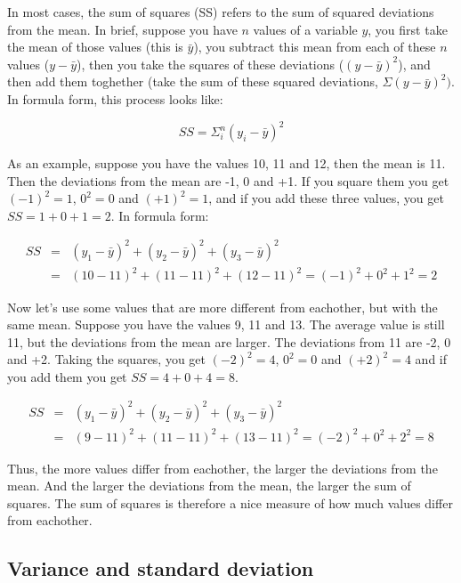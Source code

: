 \documentclass[]{book}\usepackage[]{graphicx}\usepackage[]{color}
\begin{document}
In most cases, the sum of squares (SS) refers to the sum of squared deviations from the mean. In brief, suppose you have $n$ values of a variable $y$, you first take the mean of those values (this is $\bar{y}$), you subtract this mean from each of these $n$ values ($y-\bar{y}$), then you take the squares of these deviations ($(y-\bar{y})^2$), and then add them toghether (take the sum of these squared deviations, $\Sigma (y-\bar{y})^2)$. In formula form, this process looks like:

\begin{equation}
SS = \Sigma_i^n (y_i-\bar{y})^2
\end{equation}

As an example, suppose you have the values 10, 11 and 12, then the mean is 11. Then the deviations from the mean are -1, 0 and +1. If you square them you get $(-1)^2=1$, $0^2=0$ and $(+1)^2=1$, and if you add these three values, you get $SS=1+0+1=2$. In formula form:


\begin{eqnarray}
SS &=& (y_1-\bar{y})^2 + (y_2-\bar{y})^2 +(y_3-\bar{y})^2 \\
&=& (10-11)^2 + (11-11)^2 +(12-11)^2 = (-1)^2 + 0^2 + 1^2=2 \nonumber
\end{eqnarray}

Now let's use some values that are more different from eachother, but with the same mean. Suppose you have the values 9, 11 and 13. The average value is still 11, but the deviations from the mean are larger. The deviations from 11 are -2, 0 and +2. Taking the squares, you get $(-2)^2=4$, $0^2=0$ and $(+2)^2=4$ and if you add them you get $SS=4+0+4=8$.

\begin{eqnarray}
SS &=& (y_1-\bar{y})^2 + (y_2-\bar{y})^2 +(y_3-\bar{y})^2 \\
&=& (9-11)^2 + (11-11)^2 +(13-11)^2= (-2)^2 + 0^2 + 2^2=8 \nonumber
\end{eqnarray}

Thus, the more values differ from eachother, the larger the deviations from the mean. And the larger the deviations from the mean, the larger the sum of squares. The sum of squares is therefore a nice measure of how much values differ from eachother.

\subsection{Variance and standard deviation} \label{sec:standarddeviation}
\end{document}
